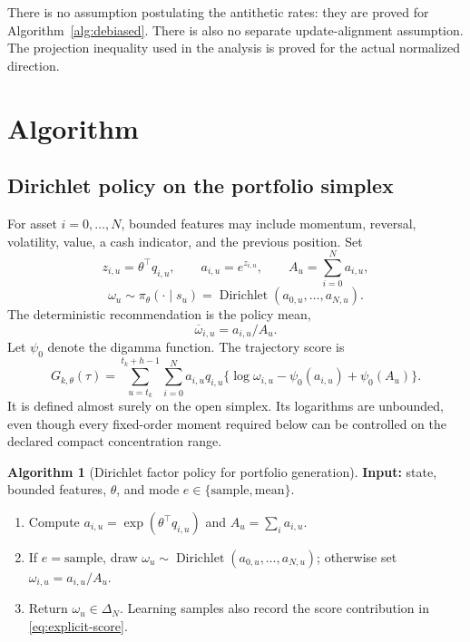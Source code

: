 \documentclass[11pt]{article}
\newcommand{\1}{\mathbf 1}
\newcommand{\Dir}{\operatorname{Dirichlet}}
\theoremstyle{definition}
\newtheorem{algorithm}{Algorithm}
\begin{document}
There is no assumption postulating the antithetic rates: they are proved for Algorithm~\ref{alg:debiased}. There is also no separate update-alignment assumption. The projection inequality used in the analysis is proved for the actual normalized direction.

\section{Algorithm}\label{sec:algorithm}
\subsection{Dirichlet policy on the portfolio simplex}
For asset $i=0,\ldots,N$, bounded features may include momentum, reversal, volatility, value, a cash indicator, and the previous position. Set
\begin{equation}\label{eq:dir-score}
 z_{i,u}=\theta^\top q_{i,u},\qquad a_{i,u}=e^{z_{i,u}},\qquad A_u=\sum_{i=0}^Na_{i,u},
\end{equation}
\begin{equation}\label{eq:dirichlet-policy}
 \omega_u\sim\pi_\theta(\cdot\mid s_u)=\Dir(a_{0,u},\ldots,a_{N,u}).
\end{equation}
The deterministic recommendation is the policy mean,
\begin{equation}\label{eq:dirichlet-mean}
 \overline\omega_{i,u}=a_{i,u}/A_u.
\end{equation}
Let $\psi_0$ denote the digamma function. The trajectory score is
\begin{equation}\label{eq:explicit-score}
 G_{k,\theta}(\tau)=\sum_{u=t_k}^{t_k+h-1}\sum_{i=0}^N
 a_{i,u}q_{i,u}
 \{\log\omega_{i,u}-\psi_0(a_{i,u})+\psi_0(A_u)\}.
\end{equation}
It is defined almost surely on the open simplex. Its logarithms are unbounded, even though every fixed-order moment required below can be controlled on the declared compact concentration range.

\begin{algorithm}[Dirichlet factor policy for portfolio generation]\label{alg:dirichlet}
\normalfont
\textbf{Input:} state, bounded features, $\theta$, and mode $e\in\{\mathrm{sample},\mathrm{mean}\}$.
\begin{enumerate}
\item Compute $a_{i,u}=\exp(\theta^\top q_{i,u})$ and $A_u=\sum_i a_{i,u}$.
\item If $e=\mathrm{sample}$, draw $\omega_u\sim\Dir(a_{0,u},\ldots,a_{N,u})$; otherwise set $\omega_{i,u}=a_{i,u}/A_u$.
\item Return $\omega_u\in\Delta_N$. Learning samples also record the score contribution in \eqref{eq:explicit-score}.
\end{enumerate}
\end{algorithm}
\end{document}
